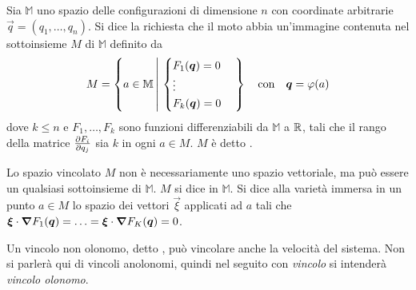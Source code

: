 \begin{definition} \label{def:constrainedConfigSpace}
  Sia $\mathbb{M}$ uno spazio delle configurazioni di dimensione $n$ con coordinate arbitrarie $\vec{q} = (q_1, \ldots, q_n)$. Si dice  la richiesta che il moto abbia un'immagine contenuta nel sottoinsieme $M$ di $\mathbb{M}$ definito da \begin{equation*}
    M = \left\{ a \in \mathbb{M} \left|\ \begin{cases} 
      F_1(\vec{q}) = 0 \\
      \vdots \\
      F_k(\vec{q}) = 0
    \end{cases} \right. \right\} \qqtext{con} \vec{q} = \phi(a)
  \end{equation*} 
  dove $k \le n$ e $F_1, \ldots, F_k$ sono funzioni differenziabili da $\mathbb{M}$ a $\mathbb{R}$, tali che il rango della matrice $\pdv{F_i}{q_j}(a)$ sia $k$ in ogni $a \in M$. $M$ è detto .
\end{definition}
\begin{remark}
  Lo spazio vincolato $M$ non è necessariamente uno spazio vettoriale, ma può essere un qualsiasi sottoinsieme di $\mathbb{M}$. $M$ si dice  in $\mathbb{M}$. Si dice  alla varietà immersa in un punto $a \in M$ lo spazio dei vettori $\vec{\xi}$ applicati ad $a$ tali che $\boldsymbol{\xi} \cdot \grad{F_1}(\boldsymbol{q}) = \ldots = \boldsymbol{\xi} \cdot \grad{F_K}(\boldsymbol{q}) = 0$.
\end{remark}
\begin{remark}
  Un vincolo non olonomo, detto , può vincolare anche la velocità del sistema. Non si parlerà qui di vincoli anolonomi, quindi nel seguito con \emph{vincolo} si intenderà \emph{vincolo olonomo}.
\end{remark}

